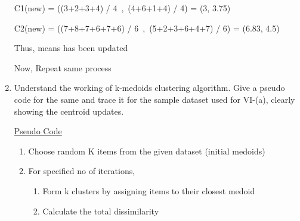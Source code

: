 \documentclass[12pt]{article}
\renewcommand{\_}{\kern-1.5pt\textunderscore\kern-1.5pt}
\begin{document}
\begin{enumerate}
{\fontsize{14pt}{16.8pt}\selectfont C1(new) = ((3+2+3+4) / 4\  ,\  (4+6+1+4) / 4) = (3, 3.75)\par}\par

{\fontsize{14pt}{16.8pt}\selectfont C2(new) = ((7+8+7+6+7+6) / 6\  ,\  (5+2+3+6+4+7) / 6) = (6.83, 4.5)\par}\par

{\fontsize{14pt}{16.8pt}\selectfont Thus, means has been updated\par}\par

{\fontsize{14pt}{16.8pt}\selectfont Now, Repeat same process\par}\par


\vspace{\baselineskip}
	\item {\fontsize{14pt}{16.8pt}\selectfont Understand the working of k-medoids clustering algorithm. Give a pseudo code for the same and trace it for the sample dataset used for VI-(a), clearly showing the centroid updates. \par}\par

{\fontsize{14pt}{16.8pt}\selectfont \uline{Pseudo Code}\par}\par

\begin{enumerate}
	\item {\fontsize{14pt}{16.8pt}\selectfont Choose random K items from the given dataset (initial medoids)\par}\par

	\item {\fontsize{14pt}{16.8pt}\selectfont For specified no of iterations,\par}\par

\begin{enumerate}
	\item {\fontsize{14pt}{16.8pt}\selectfont Form k clusters by assigning items to their closest medoid\par}\par

	\item {\fontsize{14pt}{16.8pt}\selectfont Calculate the total dissimilarity\par}\par


\end{enumerate}
\end{enumerate}
\end{enumerate}
\end{document}
